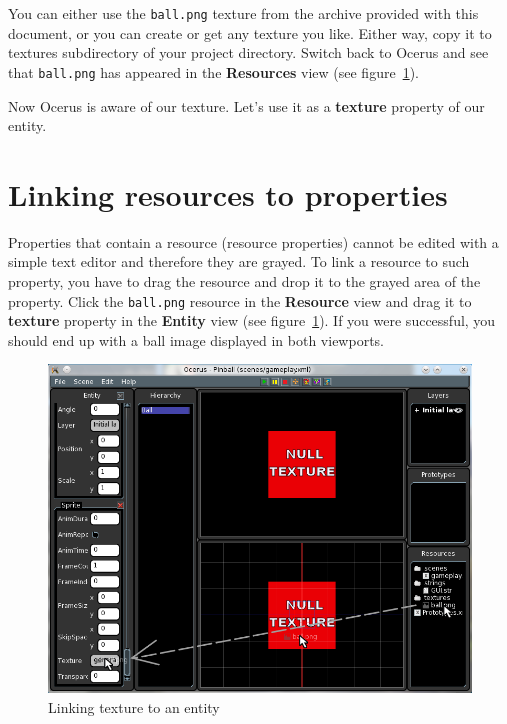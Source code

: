 \documentclass[a4paper,12pt]{article}
\begin{document}
You can either use the \texttt{ball.png} texture from the archive provided with this document, or you can create or get any texture you like. Either way, copy it to textures subdirectory of your project directory. Switch back to Ocerus and see that \texttt{ball.png} has appeared in the \textbf{Resources} view (see figure~\ref{fig:link_texture}).

Now Ocerus is aware of our texture. Let's use it as a \textbf{texture} property of our entity.

\section{Linking resources to properties}
Properties that contain a resource (resource properties) cannot be edited with a simple text editor and therefore they are grayed. To link a resource to such property, you have to drag the resource and drop it to the grayed area of the property. Click the \texttt{ball.png} resource in the \textbf{Resource} view and drag it to \textbf{texture} property in the \textbf{Entity} view (see figure~\ref{fig:link_texture}). If you were successful, you should end up with a ball image displayed in both viewports.

\begin{figure}[ht]
 \begin{center}
  \includegraphics[width=\textwidth]{LinkTexture}
 \end{center}
 \caption{Linking texture to an entity}
 \label{fig:link_texture}
\end{figure}
\end{document}
